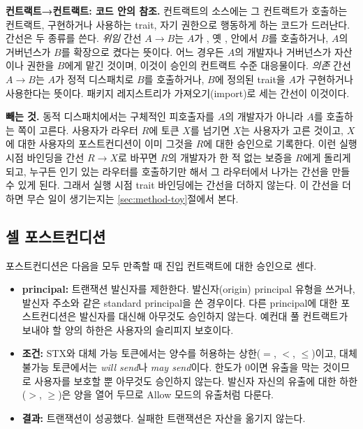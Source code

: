 \textbf{컨트랙트→컨트랙트: 코드 안의 참조.} 컨트랙트의 소스에는 그 컨트랙트가 호출하는 컨트랙트, 구현하거나 사용하는 trait, 자기 권한으로 행동하게 하는 코드가 드러난다. 간선은 두 종류를 쓴다. \emph{위임} 간선 $A\to B$는 $A$가 , 옛 ,  안에서 $B$를 호출하거나, $A$의 거버넌스가 $B$를 확장으로 켰다는 뜻이다. 어느 경우든 $A$의 개발자나 거버넌스가 자산이나 권한을 $B$에게 맡긴 것이며, 이것이 승인의 컨트랙트 수준 대응물이다. \emph{의존} 간선 $A\to B$는 $A$가 정적 디스패치로 $B$를 호출하거나, $B$에 정의된 trait을 $A$가 구현하거나 사용한다는 뜻이다. 패키지 레지스트리가 가져오기(import)로 세는 간선이 이것이다.

\textbf{빼는 것.} 동적 디스패치에서는 구체적인 피호출자를 $A$의 개발자가 아니라 $A$를 호출하는 쪽이 고른다. 사용자가 라우터 $R$에 토큰 $X$를 넘기면 $X$는 사용자가 고른 것이고, $X$에 대한 사용자의 포스트컨디션이 이미 그것을 $R$에 대한 승인으로 기록한다. 이런 실행 시점 바인딩을 간선 $R\to X$로 바꾸면 $R$의 개발자가 한 적 없는 보증을 $R$에게 돌리게 되고, 누구든 인기 있는 라우터를 호출하기만 해서 그 라우터에서 나가는 간선을 만들 수 있게 된다. 그래서 실행 시점 trait 바인딩에는 간선을 더하지 않는다. 이 간선을 더하면 무슨 일이 생기는지는 \ref{sec:method-toy}절에서 본다.

\subsection{셀 포스트컨디션}
\label{sec:mapping-rules}

포스트컨디션은 다음을 모두 만족할 때 진입 컨트랙트에 대한 승인으로 센다.

\begin{itemize}
\item \textbf{principal:} 트랜잭션 발신자를 제한한다. 발신자(origin) principal 유형을 쓰거나, 발신자 주소와 같은 standard principal을 쓴 경우이다. 다른 principal에 대한 포스트컨디션은 발신자를 대신해 아무것도 승인하지 않는다. 예컨대 풀 컨트랙트가 보내야 할 양의 하한은 사용자의 슬리피지 보호이다.
\item \textbf{조건:} STX와 대체 가능 토큰에서는 양수를 허용하는 상한($=$, $<$, $\leq$)이고, 대체 불가능 토큰에서는 \emph{will send}나 \emph{may send}이다. 한도가 0이면 유출을 막는 것이므로 사용자를 보호할 뿐 아무것도 승인하지 않는다. 발신자 자신의 유출에 대한 하한($>$, $\geq$)은 양을 열어 두므로 Allow 모드의 유출처럼 다룬다.
\item \textbf{결과:} 트랜잭션이 성공했다. 실패한 트랜잭션은 자산을 옮기지 않는다.
\end{itemize}

